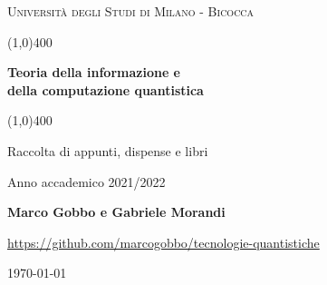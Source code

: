 \documentclass[a4paper, 12pt]{book}
\numberwithin{equation}{section}
\numberwithin{figure}{chapter}
\begin{document}
    \begin{titlepage}
        \begin{center}
            \vspace*{5cm}
            {\scshape\LARGE Università degli Studi di Milano - Bicocca \par}
            \vspace{1.0cm}
            \line(1,0){400} \\
            {\huge\bfseries Teoria della informazione e \\ della computazione quantistica \par}
            \line(1,0){400} \\
 	        \vspace{0.5cm}
            {\Large Raccolta di appunti, dispense e libri \par}
            \vspace{1.0cm}
            {Anno accademico 2021/2022 \par}
            \vspace{0.5cm}
            {\bfseries Marco Gobbo e Gabriele Morandi \par}
            \vspace{0.5cm}
            {\url{https://github.com/marcogobbo/tecnologie-quantistiche} \par}
            \vspace*{\fill}
            {\large \today \par}
        \end{center}
    \end{titlepage}
    \tableofcontents
    
    
    
    
    
    
    
    
\end{document}

